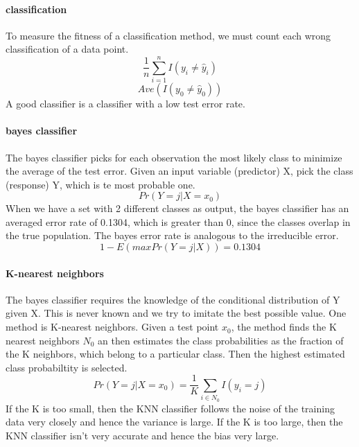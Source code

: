 \documentclass[../document.tex]{subfiles}
\begin{document}
	\paragraph{classification}
	To measure the fitness of a classification method, we must count each wrong classification of a data point.
	\begin{equation}
	\frac{1}{n}\sum_{i=1}^{n}I(y_{i} \neq \hat{y}_{i})
	\end{equation}
	\begin{equation}
	Ave(I(y_{0} \neq \hat{y}_{0}))
	\end{equation}
	A good classifier is a classifier with a low test error rate.
	
	\paragraph{bayes classifier}
	The bayes classifier picks for each observation the most likely class to minimize the average of the test error. Given an input variable (predictor) X, pick the class (response) Y, which is te most probable one.
	\begin{equation}
	Pr(Y=j|X=x_{0})
	\end{equation}
	When we have a set with 2 different classes as output, the bayes classifier has an averaged error rate of 0.1304, which is greater than 0, since the classes overlap in the true population. The bayes error rate is analogous to the irreducible error.
	\begin{equation}
	1 - E(maxPr(Y=j|X)) = 0.1304
	\end{equation}
	
	\paragraph{K-nearest neighbors}
	The bayes classifier requires the knowledge of the conditional distribution of Y given X. This is never known and we try to imitate the best possible value. One method is K-nearest neighbors. Given a test point \(x_{0}\), the method finds the K nearest neighbors \(N_{0}\) an then estimates the class probabilities as the fraction of the K neighbors, which belong to a particular class. Then the highest estimated class probabiltity is selected.
	\begin{equation}
	Pr(Y=j|X=x_{0})=\frac{1}{K}\sum_{i \in N_{0}} I(y_{i}=j)
	\end{equation}
	If the K is too small, then the KNN classifier follows the noise of the training data very closely and hence the variance is large. If the K is too large, then the KNN classifier isn't very accurate and hence the bias very large.
	
	
	
\end{document}
